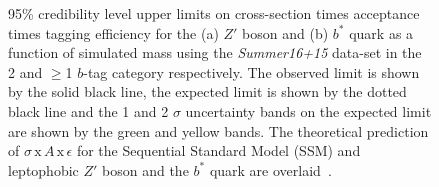 \begin{figure}[!ht]
  \centering
  \captionsetup[subfigure]{aboveskip=0pt,justification=centering}
  \hspace{2mm}
   \caption[95\% credibility level upper limits on cross-section times acceptance times tagging efficiency
             for the $Z'$ boson and $b^*$ quark as a function of simulated mass
             using the \textit{Summer16+15} data-set.]
           {95\% credibility level upper limits on cross-section times acceptance times tagging efficiency
             for the (a) $Z'$ boson and (b) $b^*$ quark  as a function of simulated mass
             using the \textit{Summer16+15} data-set in the 2 and $\geq$1 $b$-tag category respectively.
             The observed limit is shown by the solid black line,
             the expected limit is shown by the dotted black line
             and the 1 and 2 $\sigma$ uncertainty bands on the expected limit are shown by the green and yellow bands.
             The theoretical prediction of $\sigma\,\text{x}\,\mathit{A}\,\text{x}\,\epsilon$
             for the Sequential Standard Model (SSM) and leptophobic $Z'$ boson and the $b^*$ quark are overlaid~\cite{dibjet-ichep_conf}.
           }
  \label{fig:lim-summer_benchmark}
\end{figure}

